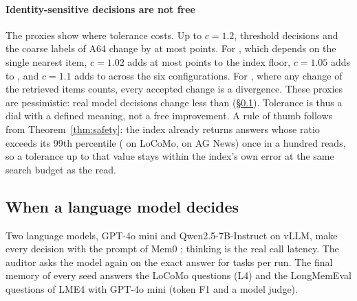 \documentclass[sigconf, nonacm, review]{acmart}
\begin{document}
\paragraph{Identity-sensitive decisions are not free}
The proxies show where tolerance costs. Up to $c=1.2$, threshold
decisions and the coarse labels of A64 change by at most  points. For , which
depends on the single nearest item, $c=1.02$ adds at most
 points to the index floor, $c=1.05$ adds
 to , and $c=1.1$ adds
 to  across the six
configurations. For , where any change of the retrieved items
counts, every accepted change is a divergence. These proxies are
pessimistic: real model decisions change less than 
(\S\ref{sec:eval-llm}). Tolerance is thus a dial with a defined
meaning, not a free improvement. A rule of thumb
follows from Theorem~\ref{thm:safety}: the index already
returns answers whose ratio exceeds its 99th percentile
( on LoCoMo,  on AG News)
once in a hundred reads, so a tolerance up to that value stays within
the index's own error at the same search budget as the read.

\subsection{When a language model decides}
\label{sec:eval-llm}

Two language models, GPT-4o mini and Qwen2.5-7B-Instruct on vLLM,
make every decision with the prompt of Mem0
\cite{DBLP:conf/ecai/ChhikaraKASY25}; thinking is the real call latency. The
auditor asks the model again on the exact answer for
 tasks per run. The final memory of every
seed answers the  LoCoMo questions (L4) and the
 LongMemEval questions of LME4 with GPT-4o mini
(token F1 and a model judge).
\end{document}
